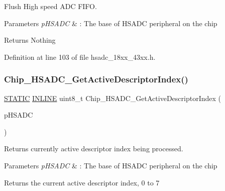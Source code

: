 Flush High speed A\+DC F\+I\+FO. 


\begin{DoxyParams}{Parameters}
{\em p\+H\+S\+A\+DC} & \+: The base of H\+S\+A\+DC peripheral on the chip \\
\hline
\end{DoxyParams}
\begin{DoxyReturn}{Returns}
Nothing 
\end{DoxyReturn}


Definition at line 103 of file hsadc\+\_\+18xx\+\_\+43xx.\+h.

\mbox{\label{group___h_s_a_d_c__18_x_x__43_x_x_ga5f206e1b3c69fd04462b01963e996745}} 
\subsubsection{\texorpdfstring{Chip\+\_\+\+H\+S\+A\+D\+C\+\_\+\+Get\+Active\+Descriptor\+Index()}{Chip\_HSADC\_GetActiveDescriptorIndex()}}
{\footnotesize\ttfamily \hyperlink{group___l_p_c___types___public___macros_ga10b2d890d871e1489bb02b7e70d9bdfb}{S\+T\+A\+T\+IC} \hyperlink{spifi__18xx__43xx_8h_a2eb6f9e0395b47b8d5e3eeae4fe0c116}{I\+N\+L\+I\+NE} uint8\+\_\+t Chip\+\_\+\+H\+S\+A\+D\+C\+\_\+\+Get\+Active\+Descriptor\+Index (\begin{DoxyParamCaption}\item[{\hyperlink{struct_l_p_c___h_s_a_d_c___t}{L\+P\+C\+\_\+\+H\+S\+A\+D\+C\+\_\+T} $\ast$}]{p\+H\+S\+A\+DC }\end{DoxyParamCaption})}



Returns currently active descriptor index being processed. 


\begin{DoxyParams}{Parameters}
{\em p\+H\+S\+A\+DC} & \+: The base of H\+S\+A\+DC peripheral on the chip \\
\hline
\end{DoxyParams}
\begin{DoxyReturn}{Returns}
the current active descriptor index, 0 to 7 
\end{DoxyReturn}


